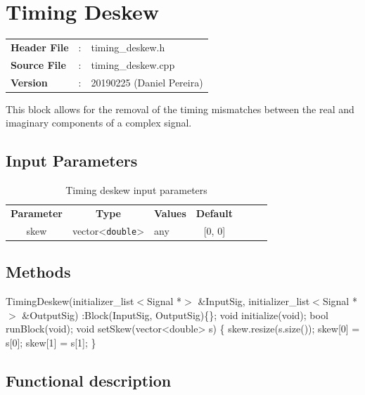 \clearpage

\section{Timing Deskew}

\begin{tcolorbox}	
	\begin{tabular}{p{2.75cm} p{0.2cm} p{10.5cm}} 	
		\textbf{Header File}   &:& timing\_deskew.h \\
		\textbf{Source File}   &:& timing\_deskew.cpp \\
        \textbf{Version}       &:& 20190225 (Daniel Pereira)\\
	\end{tabular}
\end{tcolorbox}

This block allows for the removal of the timing mismatches between the real and imaginary components of a complex signal.

\subsection*{Input Parameters}

\begin{table}[h]
	\centering
	\begin{tabular}{|c|c|p{60mm}|c|ccc}
		\cline{1-4}
		\textbf{Parameter} & \textbf{Type} & \textbf{Values} & \textbf{Default}  \\ \cline{1-4}
		skew     & vector<\texttt{double}> & any             & [0, 0]            \\ \cline{1-4}
	\end{tabular}
	\caption{Timing deskew input parameters} 
	\label{table:TimingDeskew_in_par}
\end{table}

\subsection*{Methods}

\bigbreak
TimingDeskew(initializer\_list$<$Signal *$>$ \&InputSig, initializer\_list$<$Signal *$>$ \&OutputSig) :Block(InputSig, OutputSig)\{\};
\bigbreak
void initialize(void);
\bigbreak
bool runBlock(void);
\bigbreak
void setSkew(vector<double> s) \{ skew.resize(s.size()); skew[0] = s[0]; skew[1] = s[1]; \}

\subsection*{Functional description}

